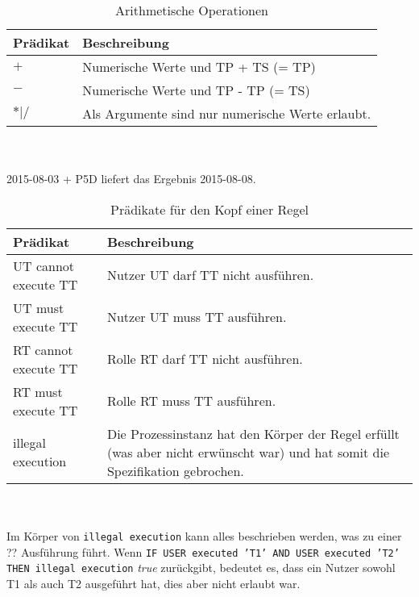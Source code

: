 \begin{table}[h]
\begin{tabular} {|p{6cm}|p{10cm}|}
\hline
\textbf{Prädikat} & \textbf{Beschreibung}\\
\hline
 $+$ 		& Numerische Werte und TP + TS (= TP) \\
\hline
 $-$		& Numerische Werte und TP - TP (= TS) \\
\hline
 $ * | / $   	& Als Argumente sind nur numerische Werte erlaubt. \\
\hline
\end{tabular}
\\\\\small 2015-08-03 + P5D liefert das Ergebnis 2015-08-08.
\caption{Arithmetische Operationen}
\label{tab:operations}
\end{table}

\begin{table}[h]
\begin{tabular} {|p{6cm}|p{10cm}|}
\hline
\textbf{Prädikat} & \textbf{Beschreibung}\\
\hline
UT cannot execute TT		& Nutzer UT darf TT nicht ausführen. \\
\hline
UT must execute TT  		& Nutzer UT muss TT ausführen. \\
\hline
RT cannot execute TT		& Rolle RT darf TT nicht ausführen.\\
\hline
RT must execute TT		& Rolle RT muss TT ausführen.\\
\hline
illegal execution		& Die Prozessinstanz hat den Körper der Regel erfüllt (was aber nicht erwünscht war) und hat somit die Spezifikation gebrochen.\\
\hline
\end{tabular}
\\\\\small Im Körper von \texttt{illegal execution} kann alles beschrieben werden, was zu einer ?? Ausführung führt. Wenn \texttt{IF USER executed 'T1' AND USER executed 'T2' THEN illegal execution} \textit{true} zurückgibt, bedeutet es, dass ein Nutzer sowohl T1 als auch T2 ausgeführt hat, dies aber nicht erlaubt war.
\caption{Prädikate für den Kopf einer Regel}
\label{tab:head}
\end{table}
